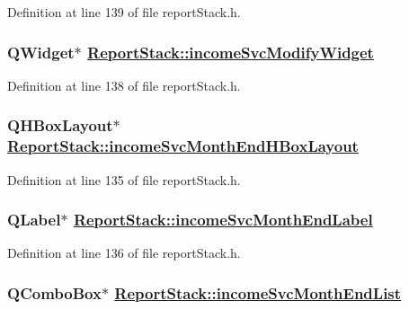 Definition at line 139 of file report\-Stack.h.\hypertarget{classReportStack_r62}{
\subsubsection[incomeSvcModifyWidget]{\setlength{\rightskip}{0pt plus 5cm}QWidget$\ast$ \hyperlink{classReportStack_r62}{Report\-Stack::income\-Svc\-Modify\-Widget}}}
\label{classReportStack_r62}


Definition at line 138 of file report\-Stack.h.\hypertarget{classReportStack_r59}{
\subsubsection[incomeSvcMonthEndHBoxLayout]{\setlength{\rightskip}{0pt plus 5cm}QHBox\-Layout$\ast$ \hyperlink{classReportStack_r59}{Report\-Stack::income\-Svc\-Month\-End\-HBox\-Layout}}}
\label{classReportStack_r59}


Definition at line 135 of file report\-Stack.h.\hypertarget{classReportStack_r60}{
\subsubsection[incomeSvcMonthEndLabel]{\setlength{\rightskip}{0pt plus 5cm}QLabel$\ast$ \hyperlink{classReportStack_r60}{Report\-Stack::income\-Svc\-Month\-End\-Label}}}
\label{classReportStack_r60}


Definition at line 136 of file report\-Stack.h.\hypertarget{classReportStack_r61}{
\subsubsection[incomeSvcMonthEndList]{\setlength{\rightskip}{0pt plus 5cm}QCombo\-Box$\ast$ \hyperlink{classReportStack_r61}{Report\-Stack::income\-Svc\-Month\-End\-List}}}
\label{classReportStack_r61}


